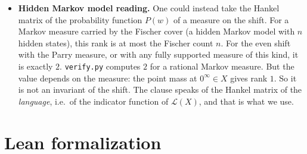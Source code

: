 \documentclass[11pt]{article}
\theoremstyle{definition}
\theoremstyle{remark}
\newcommand{\Lang}{\mathcal{L}}
\newcommand{\F}{\mathcal{F}}
\begin{document}
\begin{itemize}
More generally, the Boolean rank is \emph{always} at most the Fischer count.
If $G$ is a right-resolving presentation with $n$ vertices, then
$\F(u)=\bigcup_{q\in T(u)}\F_G(q)$. So $H$ is the Boolean product of the
$\{\text{words}\}\times n$ matrix $[q\in T(u)]$ and the $n\times\{\text{words}\}$
matrix $[v\in\F_G(q)]$. Searches over small examples found no case where the two differ,
so the clause may well be \emph{true} under the Boolean reading. We refute only the
field-rank reading. Boolean rank is a different notion and is always named as
such. Over $\mathbb Q$, $\mathbf 1_{\Lang(X)}\ne\mathbf 1_{\F(0)}+\mathbf 1_{\F(01)}$,
because both follower sets contain every word $1^k$.
\item \textbf{Hidden Markov model reading.} One could instead take the Hankel matrix
of the probability function $P(w)$ of a measure on the shift. For a Markov
measure carried by the Fischer cover (a hidden Markov model with $n$ hidden
states), this rank is at most the Fischer count $n$. For the even shift with the
Parry measure, or with any fully supported measure of this kind, it is exactly
$2$. \texttt{verify.py} computes $2$ for a rational Markov measure. But the
value depends on the measure: the point mass at $0^\infty\in X$ gives rank $1$.
So it is not an invariant of the shift. The clause speaks of the Hankel matrix
of the \emph{language}, i.e.\ of the indicator function of $\Lang(X)$, and that is
what we use.
\end{itemize}

\section{Lean formalization}
\begingroup\raggedright
\end{document}
